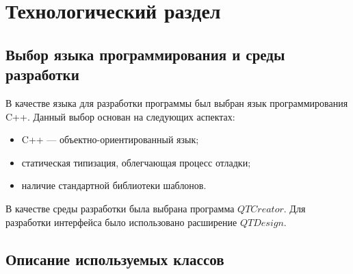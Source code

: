 \chapter{Технологический раздел}

\section{Выбор языка программирования и среды разработки}

В качестве языка для разработки программы был выбран язык программирования C++. Данный выбор основан на следующих аспектах:
\begin{itemize}[label=---]
    \item C++ --- объектно-ориентированный язык;
    \item статическая типизация, облегчающая процесс отладки;
    \item наличие стандартной библиотеки шаблонов.
\end{itemize}

В качестве среды разработки была выбрана программа $QT Creator$. Для разработки интерфейса было использовано расширение $QTDesign$.

\section{Описание используемых классов}

